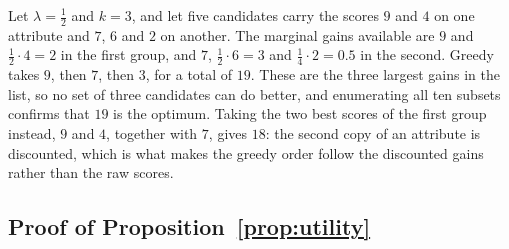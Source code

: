 \begin{example}
\label{ex:greedy}
Let $\lambda=\tfrac12$ and $k=3$, and let five candidates carry the scores $9$ and $4$ on one attribute and $7$, $6$ and $2$ on another.
The marginal gains available are $9$ and $\tfrac12\cdot4=2$ in the first group, and $7$, $\tfrac12\cdot6=3$ and $\tfrac14\cdot2=0.5$ in the second.
Greedy takes $9$, then $7$, then $3$, for a total of $19$.
These are the three largest gains in the list, so no set of three candidates can do better, and enumerating all ten subsets confirms that $19$ is the optimum.
Taking the two best scores of the first group instead, $9$ and $4$, together with $7$, gives $18$: the second copy of an attribute is discounted, which is what makes the greedy order follow the discounted gains rather than the raw scores.
\end{example}

\subsection{Proof of Proposition~\ref{prop:utility}}
\label{app:proof-utility}

